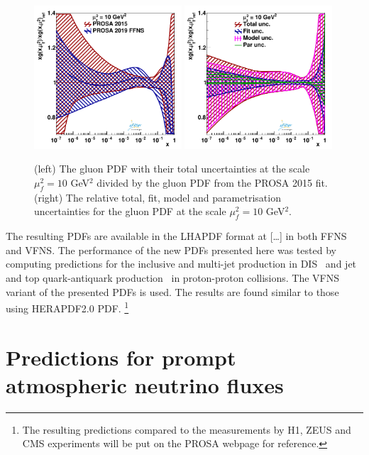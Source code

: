 \documentclass[12pt]{article}
\begin{document}
\begin{figure}
    \centering
    \includegraphics[width=0.49\textwidth]{figs/q2_10_pdf_g_ratio.pdf}
    \includegraphics[width=0.49\textwidth]{figs/gluonunc.pdf}
    \caption{(left) The gluon PDF with their total uncertainties at the scale $\mu^2_f=10$ GeV$^2$ divided by the gluon PDF from the PROSA 2015 fit. (right) The relative total, fit, model and parametrisation uncertainties for the gluon PDF at the scale $\mu^2_f=10$ GeV$^2$.}
    \label{fig:pdfratios}
\end{figure}

The resulting PDFs are available in the LHAPDF format at [\dots] in both FFNS and VFNS.
The performance of the new PDFs presented here was tested by computing predictions for the inclusive and multi-jet production in DIS~\cite{Chekanov:2002be,Chekanov:2006xr,Abramowicz:2010cka,Aktas:2007aa,Aaron:2010ac} and jet~\cite{Chatrchyan:2012bja} and top quark-antiquark production~\cite{Sirunyan:2017azo,Sirunyan:2019zvx} in proton-proton collisions. The VFNS variant of the presented PDFs is used. The results are found similar to those using HERAPDF2.0 PDF.%
\footnote{The resulting predictions compared to the measurements by H1, ZEUS and CMS experiments will be put on the PROSA webpage for reference.}


\section{Predictions for prompt atmospheric neutrino fluxes}
\label{sec:astro}
\end{document}
